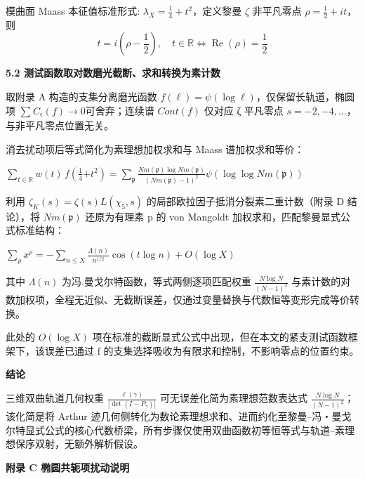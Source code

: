\documentclass[11pt,a4paper]{ctexart}
\begin{document}
模曲面 Maass 本征值标准形式: \(\lambda_{X} = \frac{1}{4} + t^{2}\)，定义黎曼 \(\zeta\) 非平凡零点 \(\rho = \frac{1}{2} + it\)，则
\[
t = i\left(\rho - \frac{1}{2}\right),\quad t \in \mathbb{R} \iff \operatorname{Re}(\rho) = \frac12
\]


\textbf{5.2 测试函数取对数磨光截断、求和转换为素计数}

取附录 A 构造的支集分离磨光函数
\(f\left( \ell \right) = \psi\left( \log\ell \right)\)，仅保留长轨道，椭圆项
\(\sum_{}^{}C_{\epsilon}(f) \rightarrow 0\)可舍弃；连续谱 \(Cont(f)\)
仅对应 ζ 平凡零点 \(s = - 2, - 4,\ldots\)，与非平凡零点位置无关。

消去扰动项后等式简化为素理想加权求和与 Maass 谱加权求和等价：

\(\sum_{t \in \mathbb{R}}^{}w(t)\, f\left( \frac{1}{4}{+ t}^{2} \right) = \sum_{\mathfrak{p}}^{}\frac{Nm\left( \mathfrak{p} \right)\log{Nm}\left( \mathfrak{p} \right)}{\left( Nm\left( \mathfrak{p} \right) - 1 \right)^{2}}\psi\left( \log{\log{Nm}}\left( \mathfrak{p} \right) \right)\)

利用 \(\zeta_{K}(s) = \zeta(s)L\left( \chi_{5},s \right)\)
的局部欧拉因子抵消分裂素二重计数（附录 D 结论），将
\(Nm\left( \mathfrak{p} \right)\) 还原为有理素 p 的 von Mangoldt
加权求和，匹配黎曼显式公式标准结构：

\(\sum_{\rho}^{}x^{\rho} = - \sum_{n \leq X}^{}\frac{\Lambda(n)}{n^{1/2}}\cos\left( t\log n \right) + O\left( \log X \right)\)

其中 \(\Lambda(n)\) 为冯.曼戈尔特函数，等式两侧逐项匹配权重
\(\frac{N\log N}{(N - 1)^{2}}\)
与素计数的对数加权项，全程无近似、无截断误差，仅通过变量替换与代数恒等变形完成等价转换。

此处的 \(O\left( \log X \right)\)
项在标准的截断显式公式中出现，但在本文的紧支测试函数框架下，该误差已通过
f 的支集选择吸收为有限求和控制，不影响零点的位置约束。

\textbf{结论}

三维双曲轨道几何权重
\(\frac{\ell\left(\gamma\right)}{\left| \det\left( I - P_{\gamma} \right) \right|}\)
可无误差化简为素理想范数表达式
\(\frac{N\log N}{(N - 1)^{2}}\)；该化简是将 Arthur
迹几何侧转化为数论素理想求和、进而约化至黎曼--冯・曼戈尔特显式公式的核心代数桥梁，所有步骤仅使用双曲函数初等恒等式与轨道--素理想保序双射，无额外解析假设。

\textbf{附录 C 椭圆共轭项扰动说明}
\end{document}
